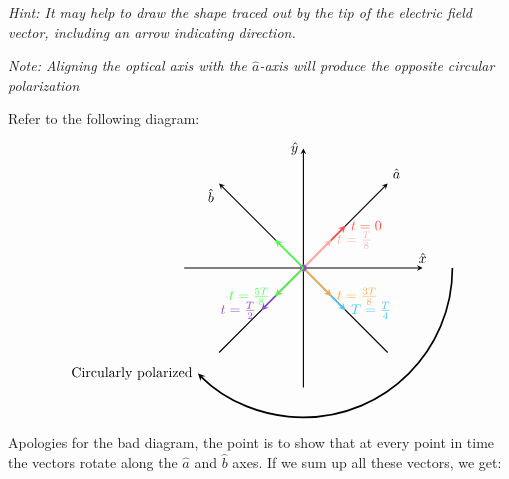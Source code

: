 \documentclass{article}
\begin{document}
\begin{enumerate}[resume, label=\alph*)]
    \textit{Hint: It may help to draw the shape traced out by the tip of the electric field vector, including an arrow indicating direction.}

    \textit{Note: Aligning the optical axis with the $\hat a$-axis will produce the opposite circular polarization}

    \begin{solution}
        Refer to the following diagram: 
        $$\begin{tikzpicture}[scale=1.5]
            \draw[thick, -stealth] (0,-2) -- (0,2) node[anchor=east] {$\hat{y}$};
            \draw[thick, -stealth] (-2,0) -- (2,0) node[anchor=south] {$\hat{x}$};
            \draw[thick,-stealth] (-1.414,-1.414) -- (1.414,1.414) node[anchor=south west] {$\hat{a}$};
            \draw[thick,-stealth] (1.414,-1.414) -- (-1.414,1.414) node[anchor=north east] {$\hat{b}$};
            \draw[very thick, -stealth, red!70] (0,0) -- (0.707,0.707) node[anchor=west] {$t = 0$};
            \filldraw[red!70] (0,0) circle (0.05cm);
            \draw[very thick, -stealth, red!30!white] (0,0) -- (0.471,0.471) node[anchor=west] {$t = \frac{T}{8}$};
            \draw[very thick, -stealth, red!30!white] (0,0) -- (0.471,-0.471);
            \draw[very thick, -stealth, cyan!70] (0,0) -- (0.707,-0.707) node[anchor=west] {$T = \frac{T}{4}$};
            \filldraw[cyan!70] (0,0) circle (0.05cm);
            \draw[very thick, -stealth, orange!70] (0,0) -- (0.471,-0.471) node[anchor=west] {$t = \frac{3T}{8}$};
            \draw[very thick, -stealth, orange!70] (0,0) -- (-0.471,-0.471);
            \draw[very thick, -stealth, violet!70!blue!70] (0,0) -- (-0.707,-0.707) node[anchor=east] {$t = \frac{T}{2}$};
            \filldraw[violet!70!blue!70] (0,0) circle (0.05cm);
            \draw[very thick, -stealth, green!70] (0,0) -- (-0.471,-0.471) node[anchor=east] {$t = \frac{5T}{8}$};
            \draw[very thick, -stealth, green!70] (0,0) -- (-0.471,0.471);
            \draw[very thick, -stealth] (2.5,0) arc (0:-135:2.5cm) node[anchor=east] {Circularly polarized};
        \end{tikzpicture}$$

        Apologies for the bad diagram, the point is to show that at every point in time the vectors rotate along the $\hat a$ and $\hat b$ axes. If we sum up all these vectors, we get: 
        

\end{solution}
\end{enumerate}
\end{document}
